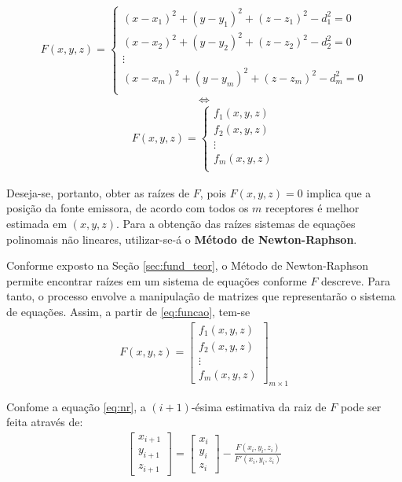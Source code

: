 	\begin{align*}
		F(x,y,z) =
		\left \{
		\begin{array}{cl}
			(x - x_1)^2 + (y - y_1)^2 + (z - z_1)^2 - d_1^2 = 0 \\
			(x - x_2)^2 + (y - y_2)^2 + (z - z_2)^2 - d_2^2 = 0 \\
			\vdots \\
			(x - x_m)^2 + (y - y_m)^2 + (z - z_m)^2 - d_m^2 = 0 \\
		\end{array}
		\right.
	\end{align*}
	$$\iff$$
	\begin{align}
		F(x,y,z) =
		\left \{
		\begin{array}{cl}
			f_1(x,y,z) \\
			f_2(x,y,z) \\
			\vdots \\
			f_m(x,y,z) \\
		\end{array}
		\right.
		\label{eq:funcao}
	\end{align}

	Deseja-se, portanto, obter as raízes de $F$, pois $F(x,y,z) = 0$ implica que a posição
	da fonte emissora, de acordo com todos os $m$ receptores é melhor estimada em $(x,y,z)$.
	Para a obtenção das raízes sistemas de equações polinomais não lineares, utilizar-se-á o
	\textbf{Método de Newton-Raphson}.

	Conforme exposto na Seção \ref{sec:fund_teor}, o Método de Newton-Raphson permite encontrar
	raízes em um sistema de equações conforme $F$ descreve. Para tanto, o processo envolve a manipulação
	de matrizes que representarão o sistema de equações. Assim, a partir de \ref{eq:funcao}, tem-se
	\begin{align*}
		F(x,y,z) =
		\begin{bmatrix}
			f_1(x,y,z) \\
			f_2(x,y,z) \\
			\vdots \\
			f_m(x,y,z)
		\end{bmatrix}_{m\times1}
	\end{align*}

	Confome a equação \ref{eq:nr}, a $(i+1)$-ésima estimativa da raiz de $F$ pode ser feita através de:
	\begin{align}
		\begin{bmatrix}
	    x_{i+1}\\
			y_{i+1}\\
			z_{i+1}
		\end{bmatrix}
		=
		\begin{bmatrix}
	    x_i\\
			y_i\\
			z_i
		\end{bmatrix}
		-
		\frac{F(x_i,y_i,z_i)}{F'(x_i, y_i, z_i)}
		\label{eq:part_nr}
	\end{align}

